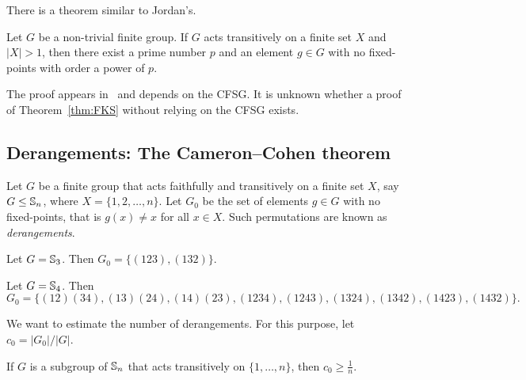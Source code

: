 There is a theorem similar to Jordan’s.

\begin{theorem}
    \label{thm:FKS}
    Let $G$ be a non-trivial finite group. If $G$ acts transitively
    on a finite set $X$ and $|X|>1$, then
    there exist a prime number $p$ and an element $g\in G$ with no fixed-points
    with order a power of $p$.
\end{theorem}

The proof appears in~\cite{MR636194} and depends on the CFSG. It is unknown whether a proof of Theorem~\ref{thm:FKS} without relying on the CFSG exists.

\subsection{Derangements: The Cameron--Cohen theorem}

Let $G$ be a finite group that acts faithfully and transitively 
on a finite set $X$, say 
$G\leq\mathbb{S}_n$, where $X=\{1,2,\dots,n\}$. Let 
$G_0$ be the set of elements $g\in G$ with no fixed-points, 
that is $g(x)\ne x$ for all $x\in X$. 
Such permutations are known as \emph{derangements}. 

\begin{example}
Let $G=\mathbb{S}_3$. Then $G_0=\{(123),(132)\}$.
\end{example}

\begin{example}
Let $G=\mathbb{S}_4$. Then 
    \[
    G_0=\{(12)(34),(13)(24),(14)(23),(1234),(1243),(1324),(1342),(1423),(1432)\}.
    \]
\end{example}

We want to estimate the number of derangements. For this purpose, let $c_0 = |G_0| / |G|$.



\begin{theorem}
    \label{thm:CameronCohen}
    If $G$ is a subgroup of $\mathbb{S}_n$ that acts transitively on 
    $\{1,\dots,n\}$, then $c_0\geq\frac{1}{n}$.
\end{theorem}

